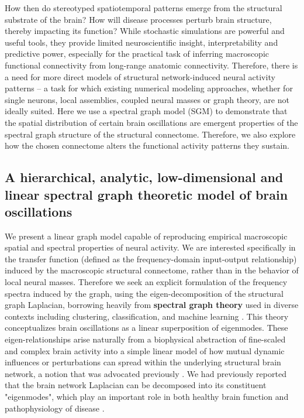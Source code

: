 How then do stereotyped spatiotemporal patterns emerge from the
structural substrate of the brain? How will disease processes perturb
brain structure, thereby impacting its function? While stochastic
simulations are powerful and useful tools, they provide limited
neuroscientific insight, interpretability and predictive power,
especially for the practical task of inferring macroscopic functional
connectivity from long-range anatomic connectivity. Therefore, there is
a need for more direct models of structural network-induced neural
activity patterns -- a task for which existing numerical modeling
approaches, whether for single neurons, local assemblies, coupled neural
masses or graph theory, are not ideally suited. Here we use a spectral
graph model (SGM) to demonstrate that the spatial distribution of
certain brain oscillations are emergent properties of the spectral graph
structure of the structural connectome. Therefore, we also explore how
the chosen connectome alters the functional activity patterns they
sustain.

\subsection{A hierarchical, analytic, low-dimensional and linear spectral
graph theoretic model of brain oscillations}
We present a linear graph model capable of reproducing empirical
macroscopic spatial and spectral properties of neural activity. We are
interested specifically in the transfer function (defined as the
frequency-domain input-output relationship) induced by the macroscopic
structural connectome, rather than in the behavior of local neural
masses. Therefore we seek an explicit formulation of the frequency
spectra induced by the graph, using the eigen-decomposition of the
structural graph Laplacian, borrowing heavily from \textbf{spectral
graph theory} used in diverse contexts including clustering,
classification, and machine learning \cite{larsen_medical_2006,Kondor02diffusionkernels,auffarth_spectral_2007,Ng01onspectral}. This
theory conceptualizes brain oscillations as a linear superposition of
eigenmodes. These eigen-relationships arise naturally from a biophysical
abstraction of fine-scaled and complex brain activity into a simple
linear model of how mutual dynamic influences or perturbations can
spread within the underlying structural brain network, a notion that was
advocated previously \cite{abdelnour_network_2014,galan_how_2008,goni_resting-brain_2014}. We had previously
reported that the brain network Laplacian can be decomposed into its
constituent "eigenmodes", which play an important role in both healthy
brain function \cite{abdelnour_network_2014,Abdelnour2018,wang_brain_2017,Atasoy2016} and pathophysiology of
disease \cite{wang_brain_2017,abdelnour_relating_2015,abdelnour_network_2016,raj_network_2012}.

